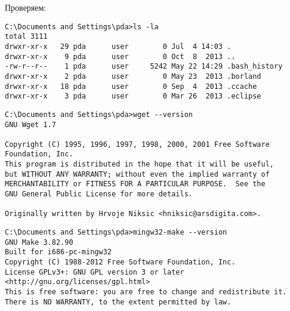 \bigskip Проверяем:
\begin{lstlisting}[style=con]
C:\Documents and Settings\pda>ls -la
total 3111
drwxr-xr-x   29 pda      user        0 Jul  4 14:03 .
drwxr-xr-x    9 pda      user        0 Oct  8  2013 ..
-rw-r--r--    1 pda      user     5242 May 22 14:29 .bash_history
drwxr-xr-x    2 pda      user        0 May 23  2013 .borland
drwxr-xr-x   18 pda      user        0 Sep  4  2013 .ccache
drwxr-xr-x    3 pda      user        0 Mar 26  2013 .eclipse
\end{lstlisting}
\begin{lstlisting}[style=con]
C:\Documents and Settings\pda>wget --version
GNU Wget 1.7

Copyright (C) 1995, 1996, 1997, 1998, 2000, 2001 Free Software Foundation, Inc.
This program is distributed in the hope that it will be useful,
but WITHOUT ANY WARRANTY; without even the implied warranty of
MERCHANTABILITY or FITNESS FOR A PARTICULAR PURPOSE.  See the
GNU General Public License for more details.

Originally written by Hrvoje Niksic <hniksic@arsdigita.com>.
\end{lstlisting}
\begin{lstlisting}[style=con]
C:\Documents and Settings\pda>mingw32-make --version
GNU Make 3.82.90
Built for i686-pc-mingw32
Copyright (C) 1988-2012 Free Software Foundation, Inc.
License GPLv3+: GNU GPL version 3 or later <http://gnu.org/licenses/gpl.html>
This is free software: you are free to change and redistribute it.
There is NO WARRANTY, to the extent permitted by law.
\end{lstlisting}
